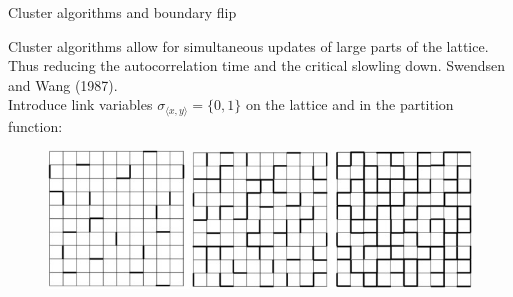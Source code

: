 \documentclass[12pt,handout]{beamer}
\begin{document}
\begin{frame}{Cluster algorithms and boundary flip}
\begin{center}

Cluster algorithms allow for simultaneous updates of large parts of the lattice. Thus reducing the autocorrelation time and the critical slowling down. Swendsen and Wang (1987).\\
\vspace{10pt}
Introduce link variables $\sigma_{\langle x, y \rangle} = \lbrace 0, 1 \rbrace$ on the lattice and in the partition function:

\begin{figure}[!htb]
\centering
\includegraphics[scale=0.4]{link.png}
\end{figure}


\end{center}
\end{frame}
\end{document}
